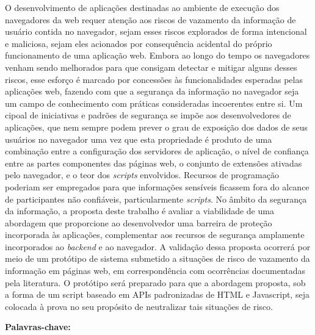 \newpage
\begin{resumo}
\normalsize

O desenvolvimento de aplicações destinadas ao ambiente de execução dos navegadores da web requer atenção aos riscos de vazamento da informação de usuário contida no navegador, sejam esses riscos explorados de forma intencional e maliciosa, sejam eles acionados por consequência acidental do próprio funcionamento de uma aplicação web. Embora ao longo do tempo os navegadores venham sendo melhorados para que consigam detectar e mitigar alguns desses riscos, esse esforço é marcado por concessões às funcionalidades esperadas pelas aplicações web, fazendo com que a segurança da informação no navegador seja um campo de conhecimento com práticas consideradas incoerentes entre si. Um cipoal de iniciativas e padrões de segurança se impõe aos desenvolvedores de aplicações, que nem sempre podem prever o grau de exposição dos dados de seus usuários no navegador uma vez que esta propriedade é produto de uma combinação entre a configuração dos servidores de aplicação, o nível de confiança entre as partes componentes das páginas web, o conjunto de extensões ativadas pelo navegador, e o teor dos \textit{scripts} envolvidos.
Recursos de programação poderiam ser empregados para que informações sensíveis ficassem fora do alcance de participantes não confiáveis, particularmente \textit{scripts}.
No âmbito da segurança da informação, a proposta deste trabalho é avaliar a viabilidade de uma abordagem que proporcione ao desenvolvedor uma barreira de proteção incorporada às aplicações, complementar aos recursos de segurança amplamente incorporados ao \textit{backend} e ao navegador.
A validação dessa proposta ocorrerá por meio de um protótipo de sistema submetido a situações de risco de vazamento da informação em páginas web, em correspondência com ocorrências documentadas pela literatura. O protótipo será preparado para que a abordagem proposta, sob a forma de um script baseado em APIs padronizadas de HTML e Javascript, seja colocada à prova no seu propósito de neutralizar tais situações de risco.


\vspace{\onelineskip}

\noindent
\textbf{Palavras-chave:} \imprimirpalavraschave
\end{resumo}

